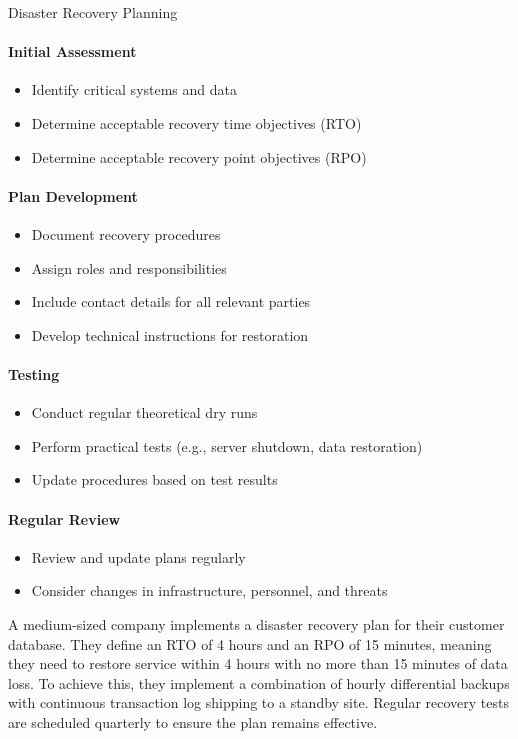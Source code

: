 \begin{KR}{Disaster Recovery Planning}\\
\paragraph{Initial Assessment}
\begin{itemize}
    \item Identify critical systems and data
    \item Determine acceptable recovery time objectives (RTO)
    \item Determine acceptable recovery point objectives (RPO)
\end{itemize}

\paragraph{Plan Development}
\begin{itemize}
    \item Document recovery procedures
    \item Assign roles and responsibilities
    \item Include contact details for all relevant parties
    \item Develop technical instructions for restoration
\end{itemize}

\paragraph{Testing}
\begin{itemize}
    \item Conduct regular theoretical dry runs
    \item Perform practical tests (e.g., server shutdown, data restoration)
    \item Update procedures based on test results
\end{itemize}

\paragraph{Regular Review}
\begin{itemize}
    \item Review and update plans regularly
    \item Consider changes in infrastructure, personnel, and threats
\end{itemize}
\end{KR}

\begin{example}
A medium-sized company implements a disaster recovery plan for their customer database. They define an RTO of 4 hours and an RPO of 15 minutes, meaning they need to restore service within 4 hours with no more than 15 minutes of data loss. To achieve this, they implement a combination of hourly differential backups with continuous transaction log shipping to a standby site. Regular recovery tests are scheduled quarterly to ensure the plan remains effective.
\end{example}